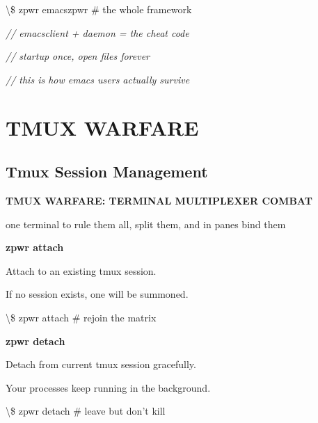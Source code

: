 \documentclass[11pt,a4paper,twoside]{book}
\begin{document}
\begin{codebox}
\textbackslash{}\$ zpwr emacszpwr              \# the whole framework\\
\end{codebox}

{\small\itshape\color{dimtext} // emacsclient + daemon = the cheat code}

{\small\itshape\color{dimtext} // startup once, open files forever}

{\small\itshape\color{dimtext} // this is how emacs users actually survive}


\vspace{16pt}


\chapter{TMUX WARFARE}

\section{Tmux Session Management}


\vspace{10pt}
{\large\bfseries\color{neoncyan} TMUX WARFARE: TERMINAL MULTIPLEXER COMBAT}\vspace{6pt}

one terminal to rule them all, split them, and in panes bind them


\vspace{12pt}
{\bfseries\color{neonyellow} zpwr attach}\vspace{4pt}

Attach to an existing tmux session.

If no session exists, one will be summoned.

\begin{codebox}
\textbackslash{}\$ zpwr attach                 \# rejoin the matrix\\
\end{codebox}


\vspace{12pt}
{\bfseries\color{neonyellow} zpwr detach}\vspace{4pt}

Detach from current tmux session gracefully.

Your processes keep running in the background.

\begin{codebox}
\textbackslash{}\$ zpwr detach                 \# leave but don't kill\\
\end{codebox}
\end{document}
